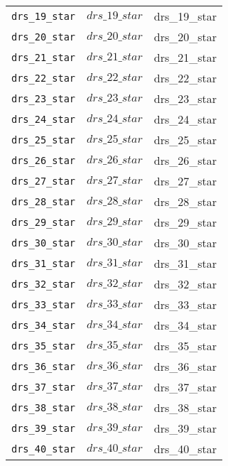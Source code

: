 \begin{center}
\begin{longtable}{ccc}
\texttt{drs\_19\_star} & $drs\_19\_star$ & drs\_19\_star\\
\texttt{drs\_20\_star} & $drs\_20\_star$ & drs\_20\_star\\
\texttt{drs\_21\_star} & $drs\_21\_star$ & drs\_21\_star\\
\texttt{drs\_22\_star} & $drs\_22\_star$ & drs\_22\_star\\
\texttt{drs\_23\_star} & $drs\_23\_star$ & drs\_23\_star\\
\texttt{drs\_24\_star} & $drs\_24\_star$ & drs\_24\_star\\
\texttt{drs\_25\_star} & $drs\_25\_star$ & drs\_25\_star\\
\texttt{drs\_26\_star} & $drs\_26\_star$ & drs\_26\_star\\
\texttt{drs\_27\_star} & $drs\_27\_star$ & drs\_27\_star\\
\texttt{drs\_28\_star} & $drs\_28\_star$ & drs\_28\_star\\
\texttt{drs\_29\_star} & $drs\_29\_star$ & drs\_29\_star\\
\texttt{drs\_30\_star} & $drs\_30\_star$ & drs\_30\_star\\
\texttt{drs\_31\_star} & $drs\_31\_star$ & drs\_31\_star\\
\texttt{drs\_32\_star} & $drs\_32\_star$ & drs\_32\_star\\
\texttt{drs\_33\_star} & $drs\_33\_star$ & drs\_33\_star\\
\texttt{drs\_34\_star} & $drs\_34\_star$ & drs\_34\_star\\
\texttt{drs\_35\_star} & $drs\_35\_star$ & drs\_35\_star\\
\texttt{drs\_36\_star} & $drs\_36\_star$ & drs\_36\_star\\
\texttt{drs\_37\_star} & $drs\_37\_star$ & drs\_37\_star\\
\texttt{drs\_38\_star} & $drs\_38\_star$ & drs\_38\_star\\
\texttt{drs\_39\_star} & $drs\_39\_star$ & drs\_39\_star\\
\texttt{drs\_40\_star} & $drs\_40\_star$ & drs\_40\_star\\
\hline%
\end{longtable}
\end{center}
